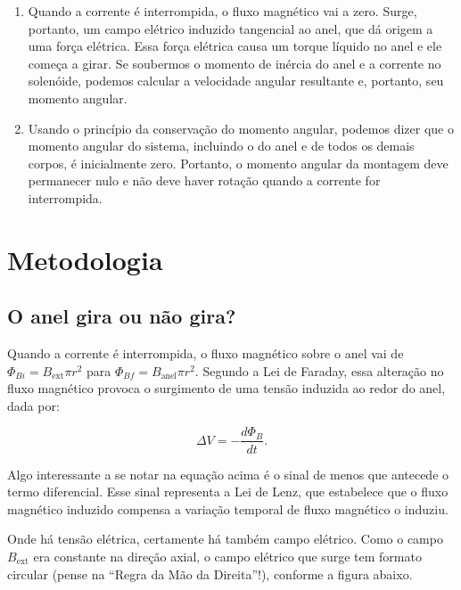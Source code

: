 \documentclass[
	article,
	11pt,
	oneside,
	a4paper,
	english,
	brazil,
	sumario=tradicional
	]{abntex2}
\begin{document}
\begin{enumerate}[label=\arabic*]

    \item\label{argumento-gira} Quando a corrente é interrompida, o fluxo magnético vai a zero. Surge, portanto, um campo elétrico induzido tangencial ao anel, que dá origem a uma força elétrica. Essa força elétrica causa um torque líquido no anel e ele começa a girar. Se soubermos o momento de inércia do anel e a corrente no solenóide, podemos calcular a velocidade angular resultante e, portanto, seu momento angular.

    \item\label{argumento-nao-gira} Usando o princípio da conservação do momento angular, podemos dizer que o momento angular do sistema, incluindo o do anel e de todos os demais corpos, é inicialmente zero. Portanto, o momento angular da montagem deve permanecer nulo e não deve haver rotação quando a corrente for interrompida.

\end{enumerate}

\section{Metodologia}

\subsection{O anel gira ou não gira?}

Quando a corrente é interrompida, o fluxo magnético sobre o anel vai de $\Phi_{Bi} = B_{\text{ext}} \pi r^2$ para $\Phi_{Bf} = B_{\text{anel}} \pi r^2$. Segundo a Lei de Faraday, essa alteração no fluxo magnético provoca o surgimento de uma tensão induzida ao redor do anel, dada por:

\begin{equation}\label{lei-de-faraday-eq}
	\Delta V = -\frac{d\Phi_B}{dt}.
\end{equation}

Algo interessante a se notar na equação acima é o sinal de menos que antecede o termo diferencial. Esse sinal representa a Lei de Lenz, que estabelece que o fluxo magnético induzido compensa a variação temporal de fluxo magnético o induziu.

Onde há tensão elétrica, certamente há também campo elétrico. Como o campo $B_{\text{ext}}$ era constante na direção axial, o campo elétrico que surge tem formato circular (pense na ``Regra da Mão da Direita''!), conforme a figura abaixo.
\end{document}
